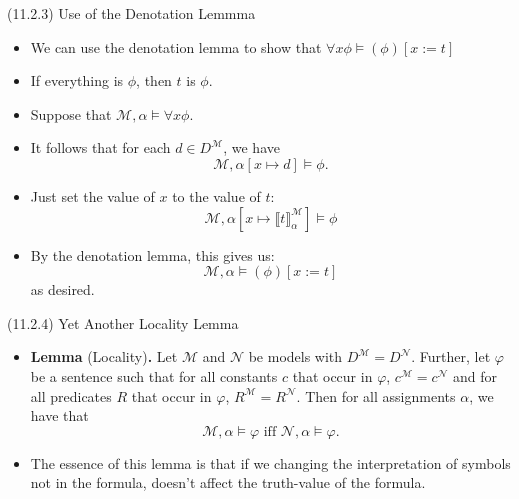 \begin{frame}{(11.2.3) Use of the Denotation Lemmma}

  \begin{itemize}
  \item We can use the denotation lemma to show that $\forall
    x\phi\vDash(\phi)[x:=t]$

  \item If everything is $\phi$, then $t$ is $\phi$.

  \item Suppose that $\mathcal{M},\alpha\vDash\forall x\phi$.

    \item It follows that for each $d\in D^\mathcal{M}$, we have
      \[\mathcal{M},\alpha[x\mapsto d]\vDash \phi.\]

    \item Just set the value of $x$ to the value of $t$:
      \[\mathcal{M},\alpha[x\mapsto \llbracket
        t\rrbracket^\mathcal{M}_\alpha]\vDash \phi\]

      \item By the denotation lemma, this gives
        us: \[\mathcal{M},\alpha\vDash(\phi)[x:=t]\] as desired.
        
    \end{itemize}



\end{frame}

\begin{frame}{(11.2.4) Yet Another Locality Lemma}

  \begin{itemize}

  \item \textbf{Lemma} (Locality)\textbf{.} Let $\mathcal{M}$ and
    $\mathcal{N}$ be models with 
              $D^\mathcal{M}=D^\mathcal{N}$. Further, let $\varphi$ be
              a sentence such that for all constants $c$ that occur in
              $\varphi$, $c^\mathcal{M}=c^\mathcal{N}$ and for all
              predicates $R$ that occur in $\varphi$,
              $R^\mathcal{M}=R^\mathcal{N}$. Then for all assignments
              $\alpha$, we have that \[\mathcal{M},\alpha\vDash
                \varphi\text{ iff }\mathcal{N},\alpha\vDash\varphi.\]

              \item The essence of this lemma is that if we changing
                the interpretation of symbols not in the formula,
                doesn't affect the truth-value of the formula.
              
  \end{itemize}
  
\end{frame}

